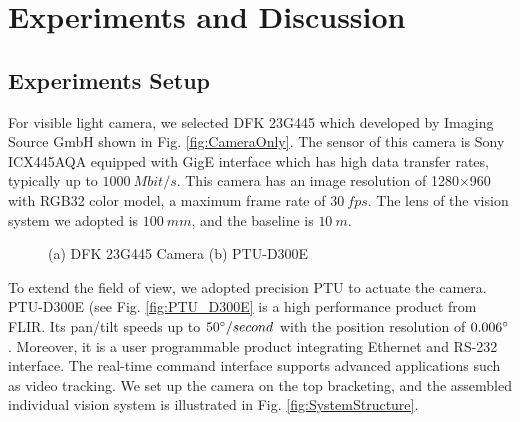 \section{Experiments and Discussion}
\subsection{Experiments Setup}

For visible light camera, we selected DFK 23G445 which developed by Imaging Source GmbH shown in Fig. \ref{fig:CameraOnly}. The sensor of this camera is Sony ICX445AQA equipped with GigE interface which has high data transfer rates, typically up to $1000\ Mbit/s$. This camera has an image resolution of 1280$\times$960 with RGB32 color model, a maximum frame rate of $30\ fps$. The lens of the vision system we adopted is $100\ mm$, and the baseline is $10\ m$. 


\begin{figure}[!tb]
	\centering
	\caption{(a) DFK 23G445 Camera (b) PTU-D300E}
\end{figure}
To extend the field of view, we adopted precision PTU to actuate the camera. PTU-D300E (see Fig. \ref{fig:PTU_D300E} is a high performance product from FLIR. Its pan/tilt speeds up to $50\degree/second$ with the position resolution of $0.006\degree$. Moreover, it is a user programmable product integrating Ethernet  and RS-232 interface. The real-time command interface supports advanced applications such as video tracking. We set up the camera on the top bracketing, and the assembled individual vision system is illustrated in Fig. \ref{fig:SystemStructure}. 


